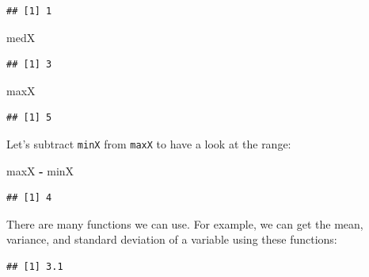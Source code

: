 \documentclass[
]{book}
\newenvironment{Shaded}{\begin{snugshade}}{\end{snugshade}}
\newcommand{\KeywordTok}[1]{\textcolor[rgb]{0.13,0.29,0.53}{\textbf{#1}}}
\newcommand{\NormalTok}[1]{#1}
\newcommand{\OperatorTok}[1]{\textcolor[rgb]{0.81,0.36,0.00}{\textbf{#1}}}
\newcommand{\StringTok}[1]{\textcolor[rgb]{0.31,0.60,0.02}{#1}}
\begin{document}
\begin{verbatim}
## [1] 1
\end{verbatim}

\begin{Shaded}
\begin{Highlighting}[]
\NormalTok{medX}
\end{Highlighting}
\end{Shaded}

\begin{verbatim}
## [1] 3
\end{verbatim}

\begin{Shaded}
\begin{Highlighting}[]
\NormalTok{maxX}
\end{Highlighting}
\end{Shaded}

\begin{verbatim}
## [1] 5
\end{verbatim}

Let's subtract \texttt{minX} from \texttt{maxX} to have a look at the range:

\begin{Shaded}
\begin{Highlighting}[]
\NormalTok{maxX }\OperatorTok{-}\StringTok{ }\NormalTok{minX}
\end{Highlighting}
\end{Shaded}

\begin{verbatim}
## [1] 4
\end{verbatim}

There are many functions we can use. For example, we can get the mean, variance, and standard deviation of a variable using these functions:

\begin{Shaded}
\end{Shaded}

\begin{verbatim}
## [1] 3.1
\end{verbatim}

\begin{Shaded}
\end{Shaded}
\end{document}
